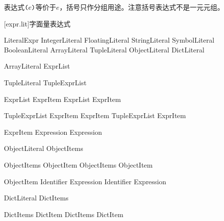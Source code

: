 \pnum
表达式$\texttt{(}e\texttt{)}$等价于$e$，括号只作分组用途。\enternote 注意括号表达式不是一元元组。\exitnote

[expr.lit]{字面量表达式}

\begin{bnf}{LiteralExpr}
    IntegerLiteral \br
    FloatingLiteral \br
    StringLiteral \br
    SymbolLiteral \br
    BooleanLiteral \br
     \br
    ArrayLiteral \br
    TupleLiteral \br
    ObjectLiteral \br
    DictLiteral
\end{bnf}

\begin{bnf}{ArrayLiteral}
    \terminal{[} ExprList\bnfq \terminal{]}
\end{bnf}

\begin{bnf}{TupleLiteral}
    \terminal{(} TupleExprList\bnfq \terminal{)}
\end{bnf}

\begin{bnf}{ExprList}
    ExprItem \br
    ExprList \terminal{,} ExprItem
\end{bnf}

\begin{bnf}{TupleExprList}
    ExprItem \terminal{,} ExprItem \br
    TupleExprList \terminal{,} ExprItem
\end{bnf}

\begin{bnf}{ExprItem}
    Expression \br
     Expression
\end{bnf}

\begin{bnf}{ObjectLiteral}
    \terminal{\{} ObjectItems \terminal{\}}
\end{bnf}

\begin{bnf}{ObjectItems}
    ObjectItem \br
    ObjectItems \terminal{,} ObjectItem
\end{bnf}

\begin{bnf}{ObjectItem}
    Identifier \terminal{:} Expression \br
    Identifier \br
     Expression
\end{bnf}

\begin{bnf}{DictLiteral}
    \terminal{\{|} DictItems\bnfq \terminal{|\}}
\end{bnf}

\begin{bnf}{DictItems}
    DictItem \br
    DictItems \terminal{,} DictItem
\end{bnf}

